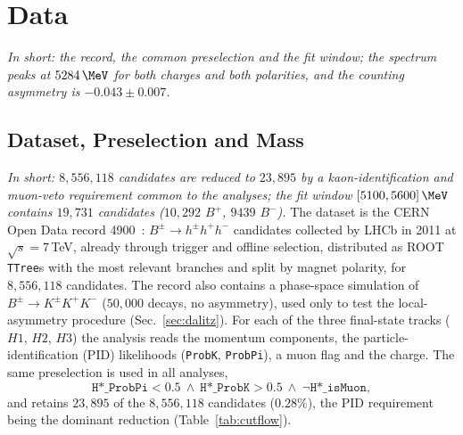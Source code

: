 \section{Data}
\label{sec:data}
\label{app:ext_data}
\emph{In short: the record, the common preselection and the fit window; the spectrum peaks at $5284\,\MeV$ for both charges and both polarities, and the counting asymmetry is $-0.043\pm0.007$.}
\subsection{Dataset, Preselection and Mass}
\label{sec:data_presel}
\emph{In short: $8{,}556{,}118$ candidates are reduced to $23{,}895$ by a kaon-identification and muon-veto requirement common to the analyses; the fit window $[5100,5600]\,\MeV$ contains $19{,}731$ candidates ($10{,}292$ $B^+$, $9439$ $B^-$).}
The dataset is the CERN Open Data record 4900~\cite{opendata_record}: $B^{\pm}\to h^{\pm}h^{+}h^{-}$ candidates collected by LHCb in 2011 at $\sqrt{s}=7$\,TeV, already through trigger and offline selection, distributed as ROOT \texttt{TTree}s with the most relevant branches and split by magnet polarity, for $8{,}556{,}118$ candidates. The record also contains a phase-space simulation of $B^{\pm}\to K^{\pm}K^{+}K^{-}$ ($50{,}000$ decays, no asymmetry), used only to test the local-asymmetry procedure (Sec.~\ref{sec:dalitz}).
For each of the three final-state tracks ($H1$, $H2$, $H3$) the analysis reads the momentum components, the particle-identification (PID) likelihoods (\texttt{ProbK}, \texttt{ProbPi}), a muon flag and the charge. The same preselection is used in all analyses,
\[
\texttt{H*\_ProbPi} < 0.5 \ \wedge\ \texttt{H*\_ProbK} > 0.5 \ \wedge\ \lnot\texttt{H*\_isMuon},
\]
and retains $23{,}895$ of the $8{,}556{,}118$ candidates ($0.28\%$), the PID requirement being the dominant reduction (Table~\ref{tab:cutflow}).

\begin{table}[h]
\centering
{}
\caption{Number of candidates passing each requirement alone and after the cumulative selection, in the order of the table, and by magnet polarity. The kaon-identification requirement on the three tracks is by far the most selective.}
\label{tab:cutflow}
\end{table}

